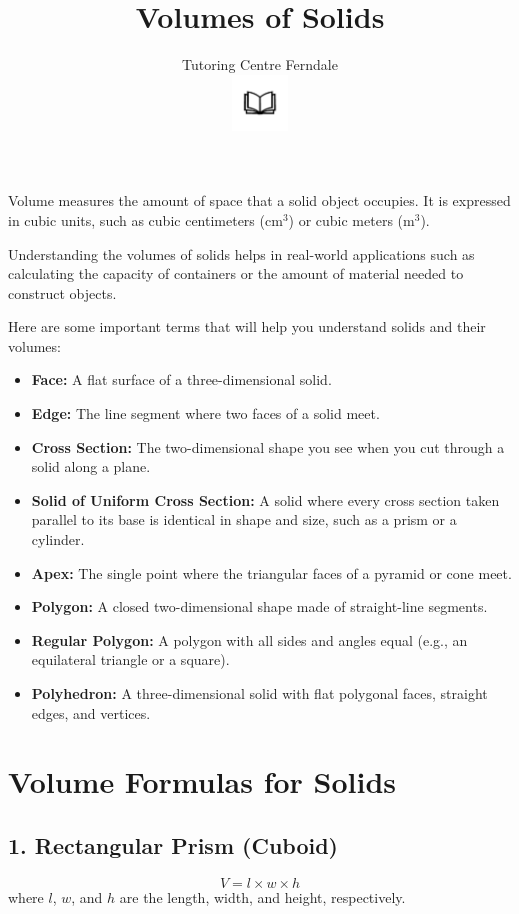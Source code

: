 \documentclass[12pt,a4paper]{article}
\title{Volumes of Solids}
\author{Tutoring Centre Ferndale\\
\includegraphics[width=4em]{ApS_logo.png}}
\date{}
\begin{document}
\maketitle

Volume measures the amount of space that a solid object occupies. It is expressed in cubic units, such as cubic centimeters (cm\(^3\)) or cubic meters (m\(^3\)).


Understanding the volumes of solids helps in real-world applications such as calculating the capacity of containers or the amount of material needed to construct objects.


Here are some important terms that will help you understand solids and their volumes:

\begin{itemize}
    \item \textbf{Face:} A flat surface of a three-dimensional solid.
    \item \textbf{Edge:} The line segment where two faces of a solid meet.
    \item \textbf{Cross Section:} The two-dimensional shape you see when you cut through a solid along a plane.
    \item \textbf{Solid of Uniform Cross Section:} A solid where every cross section taken parallel to its base is identical in shape and size, such as a prism or a cylinder.
    \item \textbf{Apex:} The single point where the triangular faces of a pyramid or cone meet.
    \item \textbf{Polygon:} A closed two-dimensional shape made of straight-line segments.
    \item \textbf{Regular Polygon:} A polygon with all sides and angles equal (e.g., an equilateral triangle or a square).
    \item \textbf{Polyhedron:} A three-dimensional solid with flat polygonal faces, straight edges, and vertices.
\end{itemize}

\section*{Volume Formulas for Solids}

\subsection*{1. Rectangular Prism (Cuboid)}
\[
V = l \times w \times h
\]
where \(l\), \(w\), and \(h\) are the length, width, and height, respectively.
\end{document}
